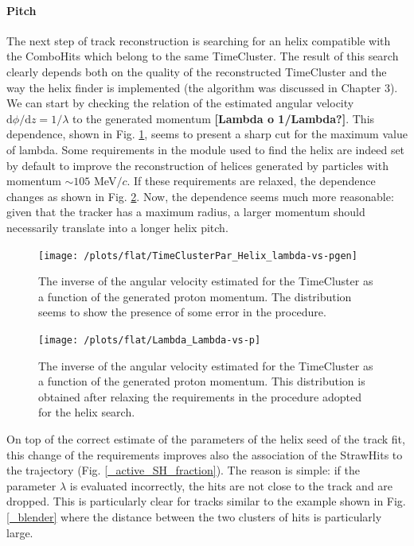 \documentclass[12pt,a4paper,openright, oneside, titlepage]{book} %
\begin{document}
\paragraph{Pitch}
The next step of track reconstruction is searching for an helix compatible 
with the ComboHits which belong to the same TimeCluster.
The result of this search clearly depends both on the quality of the reconstructed TimeCluster and the way the helix finder is implemented (the algorithm was discussed in Chapter 3). 
We can start by checking the relation of the estimated angular velocity 
$\mathrm{d}\phi/\mathrm{d}z = 1/ \lambda$ to the generated momentum \textbf{[Lambda o 1/Lambda?]}. 
This dependence, shown in Fig. \ref{_TimeClusterMVA_Lambda-vs-p}, seems to present a sharp cut for the maximum value of lambda.  
Some requirements in the module used to find the helix are indeed set by default to improve the reconstruction of helices generated by particles with momentum $\sim 105$ MeV$/c$. 
If these requirements are relaxed, the dependence changes as shown in Fig. \ref{_Lambda_Lambda-vs-p}. 
Now, the dependence seems much more reasonable: 
given that the tracker has a maximum radius, 
a larger momentum should necessarily translate into a longer helix pitch.

\begin{figure}[h!]
\centering
\texttt{[image: /plots/flat/TimeClusterPar\_Helix\_lambda-vs-pgen]}
\caption[AAA]{The inverse of the angular velocity estimated for the TimeCluster as a function of the generated proton momentum. 
The distribution seems to show the presence of some error in the procedure.}
\label{_TimeClusterMVA_Lambda-vs-p}
\end{figure}

\begin{figure}[h!]
\centering
\texttt{[image: /plots/flat/Lambda\_Lambda-vs-p]}
\caption[AAA]{The inverse of the angular velocity estimated for the TimeCluster as a function of the generated proton momentum.
This distribution is obtained after relaxing the requirements in the procedure adopted for the helix search.}
\label{_Lambda_Lambda-vs-p}
\end{figure}

\noindent On top of the correct estimate of the parameters of the helix seed of the track fit, 
this change of the requirements improves also the association of the StrawHits to the trajectory 
(Fig. \ref{_active_SH_fraction}). 
The reason is simple: 
if the parameter $\lambda$ is evaluated incorrectly, 
the hits are not close to the track and are dropped. 
This is particularly clear for tracks similar to the example shown in Fig. \ref{_blender} 
where the distance between the two clusters of hits is particularly large. 
\end{document}
